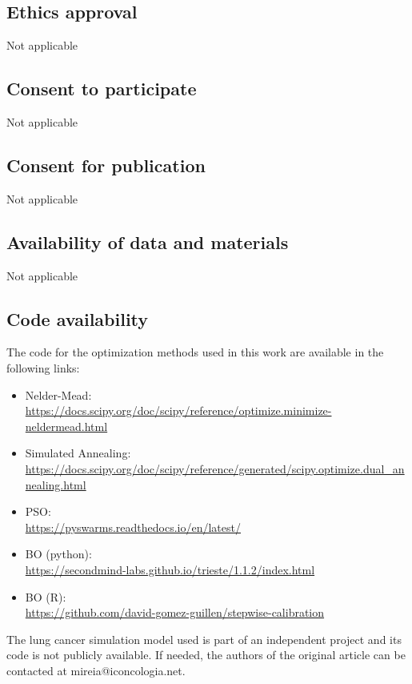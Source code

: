 \documentclass[sn-mathphys,Numbered]{sn-jnl}%
\begin{document}
\subsection*{Ethics approval}
Not applicable
\subsection*{Consent to participate}
Not applicable
\subsection*{Consent for publication}
Not applicable
\subsection*{Availability of data and materials}
Not applicable
\subsection*{Code availability}
The code for the optimization methods used in this work are available in the following links:
\begin{itemize}
	\item{Nelder-Mead: \\ \url{https://docs.scipy.org/doc/scipy/reference/optimize.minimize-neldermead.html}}
	\item{Simulated Annealing: \\ \url{https://docs.scipy.org/doc/scipy/reference/generated/scipy.optimize.dual_annealing.html}}
	\item{PSO: \\ \url{https://pyswarms.readthedocs.io/en/latest/}}
	\item{BO (python): \\ \url{https://secondmind-labs.github.io/trieste/1.1.2/index.html}}
	\item{BO (R): \\ \url{https://github.com/david-gomez-guillen/stepwise-calibration}}
\end{itemize}

The lung cancer simulation model used is part of an independent project and its code is not publicly available. If needed, the authors of the original article\cite{lung-model} can be contacted at mireia@iconcologia.net.
\end{document}
